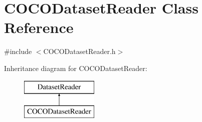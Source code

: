 \hypertarget{class_c_o_c_o_dataset_reader}{}\section{C\+O\+C\+O\+Dataset\+Reader Class Reference}
\label{class_c_o_c_o_dataset_reader}


{\ttfamily \#include $<$C\+O\+C\+O\+Dataset\+Reader.\+h$>$}

Inheritance diagram for C\+O\+C\+O\+Dataset\+Reader\+:\begin{figure}[H]
\begin{center}
\leavevmode
\includegraphics[height=2.000000cm]{class_c_o_c_o_dataset_reader}
\end{center}
\end{figure}
